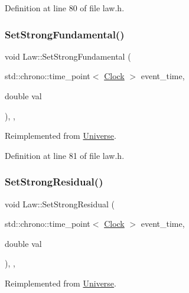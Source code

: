 Definition at line 80 of file law.\+h.

\mbox{\label{class_law_a4a7c8caa24acf453c1a8782a1ec4acf4}} 
\subsubsection{\texorpdfstring{Set\+Strong\+Fundamental()}{SetStrongFundamental()}}
{\footnotesize\ttfamily void Law\+::\+Set\+Strong\+Fundamental (\begin{DoxyParamCaption}\item[{std\+::chrono\+::time\+\_\+point$<$ \hyperlink{universe_8h_a0ef8d951d1ca5ab3cfaf7ab4c7a6fd80}{Clock} $>$}]{event\+\_\+time,  }\item[{double}]{val }\end{DoxyParamCaption})\hspace{0.3cm}{\ttfamily [inline]}, {\ttfamily [final]}, {\ttfamily [virtual]}}



Reimplemented from \hyperlink{class_universe_aafec97a231126b71c73ac1258609a284}{Universe}.



Definition at line 81 of file law.\+h.

\mbox{\label{class_law_ad4a05c77d11ddec40b1e07246cac449d}} 
\subsubsection{\texorpdfstring{Set\+Strong\+Residual()}{SetStrongResidual()}}
{\footnotesize\ttfamily void Law\+::\+Set\+Strong\+Residual (\begin{DoxyParamCaption}\item[{std\+::chrono\+::time\+\_\+point$<$ \hyperlink{universe_8h_a0ef8d951d1ca5ab3cfaf7ab4c7a6fd80}{Clock} $>$}]{event\+\_\+time,  }\item[{double}]{val }\end{DoxyParamCaption})\hspace{0.3cm}{\ttfamily [inline]}, {\ttfamily [final]}, {\ttfamily [virtual]}}



Reimplemented from \hyperlink{class_universe_a1b2d6197ddf3d613cc30bd04d22ed8b7}{Universe}.



